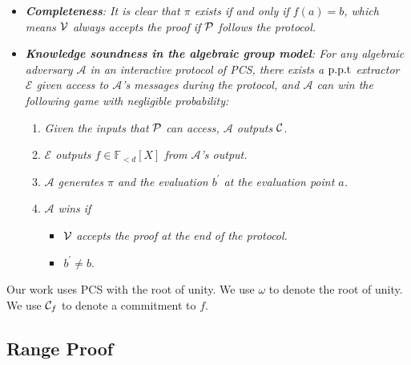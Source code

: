 \begin{itemize}
    \item \textit{\textbf{Completeness}: It is clear that $\pi$ exists if and only if $f(a)=b$, which means $\mathcal{V}$ always accepts the proof if $\mathcal{P}$ follows the protocol.}
    \item \textit{\textbf{Knowledge soundness in the algebraic group model}: For any algebraic adversary $\mathcal{A}$ in an interactive protocol of PCS, there exists a $\text{p.p.t}$ extractor $\mathcal{E}$ given access to $\mathcal{A}$'s messages during the protocol, and $\mathcal{A}$ can win the following game with negligible probability:}
    \begin{enumerate}
        \item \textit{Given the inputs that} $\mathcal{P}$ \textit{can access, $\mathcal{A}$ outputs} $\mathcal{C}$.
        \item \textit{$\mathcal{E}$ outputs $f\in\mathbb{F}_{<d}[X]$ from $\mathcal{A}$'s output.}
        \item \textit{$\mathcal{A}$ generates $\pi$ and the evaluation $b^\prime$ at the evaluation point $a$.}
        \item \textit{$\mathcal{A}$ wins if}
        \begin{itemize}
            \item $\mathcal{V}$ \textit{accepts the proof at the end of the protocol.}
            \item $b^\prime\ne{b}$.
        \end{itemize}
    \end{enumerate}
\end{itemize}
Our work uses PCS with the root of unity. We use $\omega$ to denote the root of unity. We use $\mathcal{C}_f$ to denote a commitment to $f$.

\subsection{Range Proof}
\label{sec:range}

